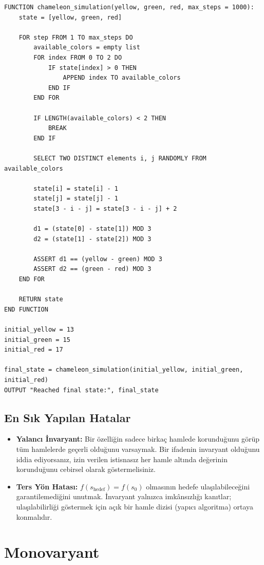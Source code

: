 \begin{lstlisting}
FUNCTION chameleon_simulation(yellow, green, red, max_steps = 1000):
    state = [yellow, green, red]

    FOR step FROM 1 TO max_steps DO
        available_colors = empty list
        FOR index FROM 0 TO 2 DO
            IF state[index] > 0 THEN
                APPEND index TO available_colors
            END IF
        END FOR

        IF LENGTH(available_colors) < 2 THEN
            BREAK
        END IF

        SELECT TWO DISTINCT elements i, j RANDOMLY FROM available_colors

        state[i] = state[i] - 1
        state[j] = state[j] - 1
        state[3 - i - j] = state[3 - i - j] + 2

        d1 = (state[0] - state[1]) MOD 3
        d2 = (state[1] - state[2]) MOD 3

        ASSERT d1 == (yellow - green) MOD 3
        ASSERT d2 == (green - red) MOD 3
    END FOR

    RETURN state
END FUNCTION

initial_yellow = 13
initial_green = 15
initial_red = 17

final_state = chameleon_simulation(initial_yellow, initial_green, initial_red)
OUTPUT "Reached final state:", final_state\end{lstlisting}

\subsection{En Sık Yapılan Hatalar}
\begin{itemize}
    \item \textbf{Yalancı İnvaryant:} Bir özelliğin sadece birkaç hamlede korunduğunu görüp tüm hamlelerde geçerli olduğunu varsaymak. Bir ifadenin invaryant olduğunu iddia ediyorsanız, izin verilen istisnasız her hamle altında değerinin korunduğunu cebirsel olarak göstermelisiniz.
    \item \textbf{Ters Yön Hatası:} $f(s_{\text{hedef}}) = f(s_0)$ olmasının hedefe ulaşılabileceğini garantilemediğini unutmak. İnvaryant yalnızca imkânsızlığı kanıtlar; ulaşılabilirliği göstermek için açık bir hamle dizisi (yapıcı algoritma) ortaya konmalıdır.
\end{itemize}

\section{Monovaryant}

